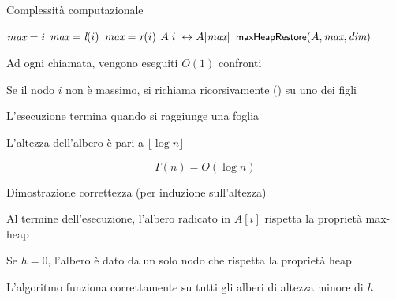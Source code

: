 \begin{frame}{Complessità computazionale}


\begin{overprint}
\begin{Procedure}
\caption[A]{\maxheapify($\Item[\,]\ A$, \INTEGER $i$, \INTEGER \heapcount)}

\INTEGER $\textit{max} = i$\;
{
  $\textit{max} = \textit{l}(i)$
}
{
  $\textit{max} = \textit{r}(i)$
}
{
  $A[i] \leftrightarrow A[\textit{max}]$\;
  $\textsf{{\small maxHeapRestore}}(A, \textit{max}, \textit{dim})$\;
}
\end{Procedure}
\vspace{12pt}
\BI
\item Ad ogni chiamata, vengono eseguiti $O(1)$ confronti
\item Se il nodo $i$ non è massimo, si richiama ricorsivamente
\maxheapify() su uno dei figli 
\item L'esecuzione termina quando si raggiunge una foglia
\item L'altezza dell'albero è pari a $\lfloor \log n \rfloor$

\EI
{}
\[
  T(n) = O(\log n)
\]
\end{overprint}

\end{frame}

\begin{frame}{Dimostrazione correttezza (per induzione sull'altezza)}

\begin{myboxtitle}[Teorema]
Al termine dell'esecuzione, l'albero radicato in $A[i]$
rispetta la proprietà max-heap
\end{myboxtitle}

\pause
\begin{myboxtitle}[Caso base: altezza $h=0$]
Se $h=0$, l'albero è dato da un solo nodo che rispetta la
proprietà heap
\end{myboxtitle}

\begin{myboxtitle}
L'algoritmo funziona correttamente su tutti gli alberi di altezza minore di $h$
\end{myboxtitle}

\end{frame}

